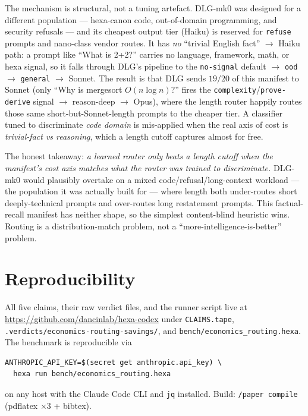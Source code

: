 \documentclass[11pt,a4paper]{article}
\begin{document}
The mechanism is structural, not a tuning artefact. DLG-mk0 was
designed for a different population --- hexa-canon code, out-of-domain
programming, and security refusals --- and its cheapest output tier
(Haiku) is reserved for \texttt{refuse} prompts and nano-class vendor
routes. It has \emph{no} ``trivial English fact'' $\to$ Haiku path: a
prompt like ``What is 2+2?'' carries no language, framework, math, or
hexa signal, so it falls through DLG's pipeline to the
\texttt{no-signal} default $\to$ \texttt{ood} $\to$ \texttt{general}
$\to$ Sonnet. The result is that DLG sends $19/20$ of this manifest to
Sonnet (only ``Why is mergesort $O(n\log n)$?'' fires the
\texttt{complexity}/\texttt{prove-derive} signal $\to$ reason-deep
$\to$ Opus), where the length router happily routes those same
short-but-Sonnet-length prompts to the cheaper tier. A classifier
tuned to discriminate \emph{code domain} is mis-applied when the real
axis of cost is \emph{trivial-fact vs reasoning}, which a length cutoff
captures almost for free.

The honest takeaway: \emph{a learned router only beats a length cutoff
when the manifest's cost axis matches what the router was trained to
discriminate.} DLG-mk0 would plausibly overtake on a mixed
code/refusal/long-context workload --- the population it was actually
built for --- where length both under-routes short deeply-technical
prompts and over-routes long restatement prompts. This factual-recall
manifest has neither shape, so the simplest content-blind heuristic
wins. Routing is a distribution-match problem, not a
``more-intelligence-is-better'' problem.

\section*{Reproducibility}

All five claims, their raw verdict files, and the runner script live
at \url{https://github.com/dancinlab/hexa-codex} under
\texttt{CLAIMS.tape}, \texttt{.verdicts/economics-routing-savings/},
and \texttt{bench/economics\_routing.hexa}. The benchmark is
reproducible via
\begin{verbatim}
ANTHROPIC_API_KEY=$(secret get anthropic.api_key) \
  hexa run bench/economics_routing.hexa
\end{verbatim}
on any host with the Claude Code CLI and \texttt{jq} installed.
Build: \texttt{/paper compile} (pdflatex $\times 3$ + bibtex).



\end{document}
